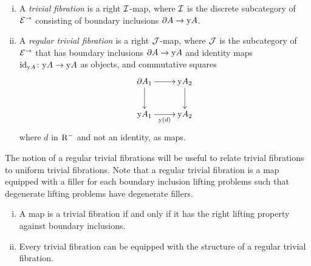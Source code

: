 \documentclass[reqno,10pt,a4paper,oneside,draft]{amsart}
\begin{document}
\begin{definition} \hfill
\begin{enumerate}[(i)]
\item A \emph{trivial fibration} is a right $\cal{I}$-map, where $\cal{I}$ is the discrete subcategory of $\catE^{\to}$ consisting of boundary inclusions $\partial A \to \yon A$.
\item A \emph{regular trivial fibration} is a right $\cal{J}$-map, where $\cal{J}$ is the subcategory of~$\catE^{\to}$ that has boundary inclusions $\partial A \to \yon A$ and identity maps $\id_{\yon A} \co \yon A \to \yon A$ as objects, and commutative squares
\[
\xymatrix{
  \partial A_1
  \ar[r]
  \ar[d]
&
  \yon A_2
  \ar[d]
\\
  \yon A_1
  \ar[r]_{\yon(d)}
&
  \yon A_2
}
\]
where $d$ in $\Rm$ and not an identity, as maps.
\end{enumerate}
\end{definition}

The notion of a regular trivial fibrations will be useful to relate trivial fibrations to uniform trivial fibrations.
Note that a regular trivial fibration is a map equipped with a filler for each boundary inclusion lifting problems such that degenerate lifting problems have degenerate fillers.

\begin{proposition} \label{trivial-fibration-to-regular} \hfill
\begin{enumerate}[(i)]
\item A map is a trivial fibration if and only if it has the right lifting property against boundary inclusions.
\item Every trivial fibration can be equipped with the structure of a regular trivial fibration.
\end{enumerate}
\end{proposition}
\end{document}
